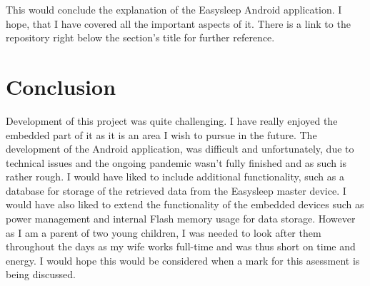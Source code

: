 \documentclass[12pt,a4paper]{article}
\begin{document}
    This would conclude the explanation of the Easysleep Android application. I hope, that I have covered all the important aspects of it. There is a link to the repository right below the section's title for further reference.
    \newpage

    \section{Conclusion}
    Development of this project was quite challenging. I have really enjoyed the embedded part of it as it is an area I wish to pursue in the future. The development of the Android application, was difficult and unfortunately, due to technical issues and the ongoing pandemic wasn't fully finished and as such is rather rough. I would have liked to include additional functionality, such as a database for storage of the retrieved data from the Easysleep master device. I would have also liked to extend the functionality of the embedded devices such as power management and internal Flash memory usage for data storage. However as I am a parent of two young children, I was needed to look after them throughout the days as my wife works full-time and was thus short on time and energy. I would hope this would be considered when a mark for this asessment is being discussed.
    \newpage
    
\end{document}
